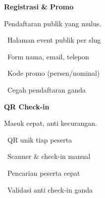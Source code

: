 \documentclass[a4paper]{article}
\begin{document}
\vspace{8pt}

\noindent
\begin{minipage}[t]{0.485\textwidth}
    \colorbox{PurplePrimary}{%
        \begin{minipage}{\dimexpr\textwidth-2\fboxsep\relax}
            {\fontsize{10}{13}\selectfont\bfseries\color{White} Registrasi \& Promo}
        \end{minipage}}\par
    \vspace{4pt}
    {\fontsize{9}{12}\selectfont\color{TextDark}%
    Pendaftaran publik yang mulus.\par\vspace{3pt}
    \textbullet\ Halaman event publik per slug\par\vspace{2pt}%
    \textbullet\ Form nama, email, telepon\par\vspace{2pt}%
    \textbullet\ Kode promo (persen/nominal)\par\vspace{2pt}%
    \textbullet\ Cegah pendaftaran ganda}%

\end{minipage}%
\hfill
\begin{minipage}[t]{0.485\textwidth}
    \colorbox{BlueDark}{%
        \begin{minipage}{\dimexpr\textwidth-2\fboxsep\relax}
            {\fontsize{10}{13}\selectfont\bfseries\color{White} QR Check-in}
        \end{minipage}}\par
    \vspace{4pt}
    {\fontsize{9}{12}\selectfont\color{TextDark}%
    Masuk cepat, anti kecurangan.\par\vspace{3pt}
    \textbullet\ QR unik tiap peserta\par\vspace{2pt}%
    \textbullet\ Scanner \& check-in manual\par\vspace{2pt}%
    \textbullet\ Pencarian peserta cepat\par\vspace{2pt}%
    \textbullet\ Validasi anti check-in ganda}%

\end{minipage}

\vspace{8pt}
\end{document}

